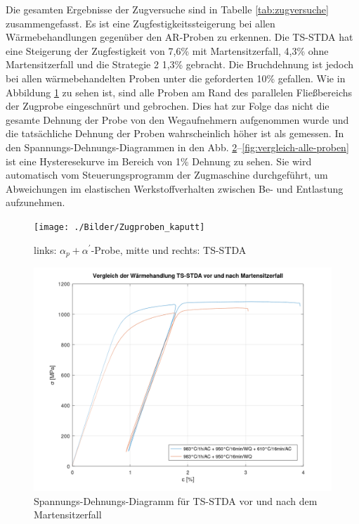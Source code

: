 Die gesamten Ergebnisse der Zugversuche sind in Tabelle \ref{tab:zugversuche} zusammengefasst. Es ist eine Zugfestigkeitssteigerung bei allen Wärmebehandlungen gegenüber den AR-Proben zu erkennen. Die TS-STDA hat eine Steigerung der Zugfestigkeit von 7,6\% mit Martensitzerfall, 4,3\% ohne Martensitzerfall und die Strategie 2 1,3\%  gebracht. Die Bruchdehnung ist jedoch bei allen wärmebehandelten Proben unter die geforderten 10\% gefallen. 
Wie in Abbildung \ref{fig:zugkaputt} zu sehen ist, sind alle Proben am Rand des parallelen Fließbereichs der Zugprobe eingeschnürt und gebrochen. Dies hat zur Folge das nicht die gesamte Dehnung der Probe von den Wegaufnehmern aufgenommen wurde und die tatsächliche Dehnung der Proben wahrscheinlich höher ist als gemessen. In den Spannungs-Dehnungs-Diagrammen in den Abb. \ref{fig:vergleich-vor-und-nach-zerfall}--\ref{fig:vergleich-alle-proben} ist eine Hysteresekurve im Bereich von 1\% Dehnung zu sehen. Sie wird automatisch vom Steuerungsprogramm der Zugmaschine durchgeführt, um Abweichungen im elastischen Werkstoffverhalten zwischen Be- und Entlastung aufzunehmen. 


\begin{figure}
	\centering
	\texttt{[image: ./Bilder/Zugproben\_kaputt]}
	\caption{links: $\alpha_p + \alpha^\prime$-Probe, mitte und rechts: TS-STDA}
	\label{fig:zugkaputt}
\end{figure}

\begin{figure}
	\centering
	\includegraphics[width=0.8\linewidth]{./Bilder/Vergleich vor und nach Zerfall}
	\caption{Spannungs-Dehnungs-Diagramm für TS-STDA vor und nach dem Martensitzerfall}
	\label{fig:vergleich-vor-und-nach-zerfall}
\end{figure}

